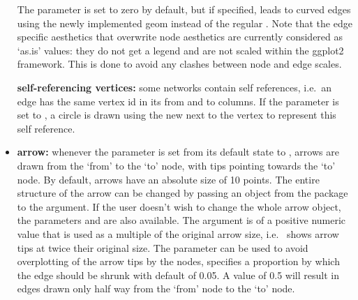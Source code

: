 \begin{itemize}
The parameter  is set to zero by default, but if specified, leads to curved edges using the newly implemented  geom  instead of the regular .
Note that the edge specific aesthetics that overwrite node aesthetics are currently considered as `as.is' values: they do not get a legend and are not scaled within the ggplot2 framework. This is done to avoid any clashes between node and edge scales.

{\bf self-referencing vertices:} some networks contain self references, i.e.\  an edge has the same vertex id in its from and to columns. If the parameter  is set to , a circle is drawn using the new  next to the vertex to represent this self reference.

\item {\bf arrow:} whenever the parameter  is set from its default state to , arrows are drawn from the `from' to the `to' node, with tips pointing towards the `to' node.  By default, arrows have an absolute size of 10 points. The entire structure of the arrow can be changed by passing an  object from the  package to the  argument. If the user doesn't wish to change the whole arrow object, the parameters  and  are also available. The  argument is of a positive numeric value that is used as a multiple of the original arrow size, i.e.\  shows arrow tips at twice their original size.  The parameter  can be used to avoid overplotting of the arrow tips by the nodes,  specifies a proportion by which the edge should be shrunk with default of 0.05. A value of 0.5 will result in edges drawn only half way from the `from' node to the `to' node.

\end{itemize}
